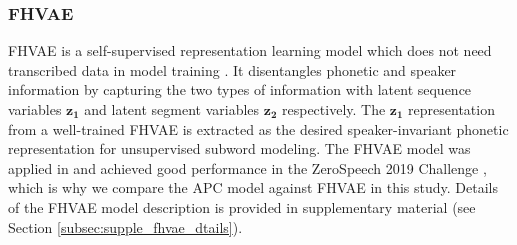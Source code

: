 \documentclass[transmag]{IEEEtran}
\begin{document}
\subsubsection{FHVAE}
 FHVAE  is a self-supervised representation learning model which does not need  transcribed  data in model training \cite{hsu2017nips}. It
disentangles phonetic and speaker information by capturing the two types of information with latent sequence variables $\bm{z_1}$ and latent segment variables $\bm{z_2}$ respectively. The  $\bm{z_1}$ representation from a well-trained FHVAE is extracted as the desired speaker-invariant  phonetic representation for unsupervised subword modeling.
The FHVAE model was applied in    \cite{Feng2019combining} and achieved good performance in the ZeroSpeech 2019 Challenge \cite{Dunbar2019}, which is why we compare the APC model against FHVAE in this study.
Details of the FHVAE model description is provided in supplementary material (see Section \ref{subsec:supple_fhvae_dtails}). 


\end{document}
